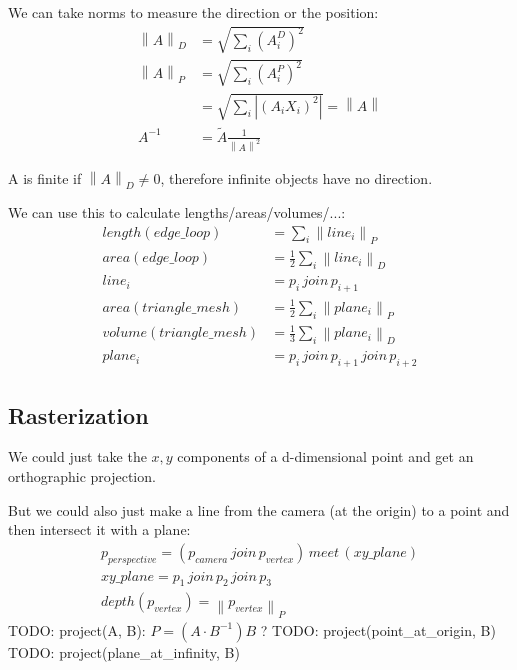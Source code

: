 \documentclass[twoside]{article}
\newcommand{\M}[1]{\scriptstyle{#1}} %
\newcommand{\B}[1]{\left(#1\right)} %
\newcommand{\F}[2]{\frac{#1}{#2}} %
\newcommand{\join}{{\,\M{join}\,}}
\newcommand{\meet}{{\,\M{meet}\,}}
\newcommand{\norm}[1]{{\left\lVert{#1}\right\rVert}}
\newcommand{\aside}[1]{\begin{flushright}\scriptsize{#1}\end{flushright}}
\begin{document}
\begin{multicols*}{2}
            \par
                We can take norms to measure the direction or the position:
                \begin{align*}
                    \norm{A}_D &= \sqrt{\sum_i \B{A^D_i}^2} \\
                    \norm{A}_P &= \sqrt{\sum_i \B{A^P_i}^2} \\
                    &= \sqrt{\sum_i |\B{A_i X_i}^2|} = \norm{A} \\
                    A^{-1} &= \tilde{A} \F{1}{\norm{A}^2}
                \end{align*}
                \aside{A is finite if $ \norm{A}_D \ne 0 $, therefore infinite objects have no direction.}
            \vfill\null\columnbreak
            \par
                We can use this to calculate lengths/areas/volumes/...:
                \begin{align*}
                    length(edge\_loop) &= \sum_i \norm{line_i}_P \\
                    area(edge\_loop) &= \F{1}{2} \sum_i \norm{line_i}_D \\
                    line_i &= p_i \join p_{i+1} \\
                    area(triangle\_mesh) &= \F{1}{2} \sum_i \norm{plane_i}_P \\
                    volume(triangle\_mesh) &= \F{1}{3} \sum_i \norm{plane_i}_D \\
                    plane_i &= p_i \join p_{i+1} \join p_{i+2}
                \end{align*}
            \subsection{Rasterization}
            \par
                We could just take the $ x,y $ components of a d-dimensional point and get an orthographic projection.
            \par
                But we could also just make a line from the camera (at the origin) to a point and then intersect it with a plane:
                \begin{gather*}
                    p_{perspective} = (p_{camera} \join p_{vertex}) \meet (xy\_plane) \\
                    xy\_plane = p_1 \join p_2 \join p_3 \\
                    depth(p_{vertex}) = \norm{p_{vertex}}_P
                \end{gather*}
                TODO: project(A, B): $ P = (A \cdot B^{-1}) B $ ? %
                TODO: project(point\_at\_origin, B)
                TODO: project(plane\_at\_infinity, B)

\end{multicols*}
\end{document}
